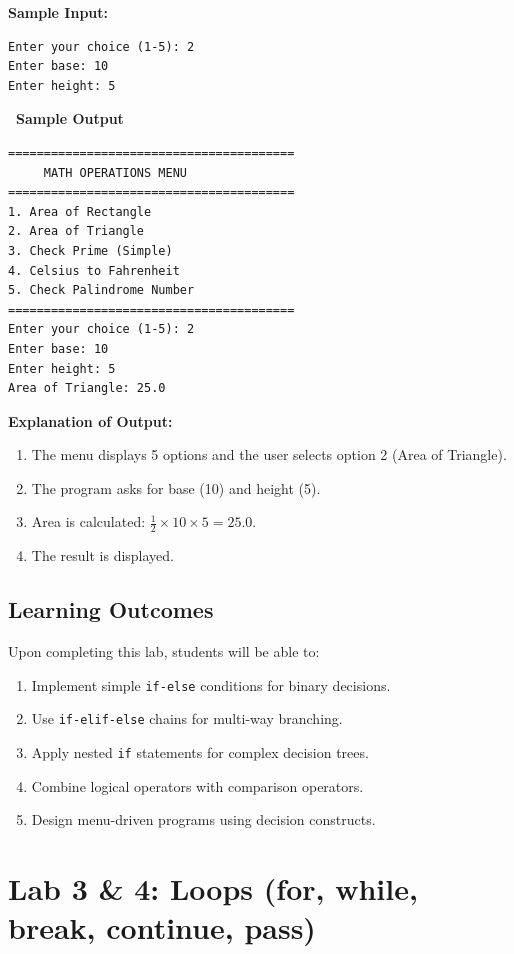 \documentclass[12pt,a4paper]{article}
\newcommand{\outhead}{\noindent\colorbox{cmrgreen!25}%
  {\textbf{\small\color{cmrdark}~Sample Output~}}\par\vspace{-1pt}}
\begin{document}
\textbf{Sample Input:}
\begin{verbatim}
Enter your choice (1-5): 2
Enter base: 10
Enter height: 5
\end{verbatim}

\outhead
\begin{lstlisting}[style=outputstyle]
========================================
     MATH OPERATIONS MENU
========================================
1. Area of Rectangle
2. Area of Triangle
3. Check Prime (Simple)
4. Celsius to Fahrenheit
5. Check Palindrome Number
========================================
Enter your choice (1-5): 2
Enter base: 10
Enter height: 5
Area of Triangle: 25.0
\end{lstlisting}

\textbf{Explanation of Output:}
\begin{enumerate}
  \item The menu displays 5 options and the user selects option 2 (Area of Triangle).
  \item The program asks for base (10) and height (5).
  \item Area is calculated: $\frac{1}{2} \times 10 \times 5 = 25.0$.
  \item The result is displayed.
\end{enumerate}

\subsection{Learning Outcomes}
Upon completing this lab, students will be able to:
\begin{enumerate}
  \item Implement simple \texttt{if-else} conditions for binary decisions.
  \item Use \texttt{if-elif-else} chains for multi-way branching.
  \item Apply nested \texttt{if} statements for complex decision trees.
  \item Combine logical operators with comparison operators.
  \item Design menu-driven programs using decision constructs.
\end{enumerate}

\newpage

\section{Lab 3 \& 4: Loops (for, while, break, continue, pass)}
\end{document}
